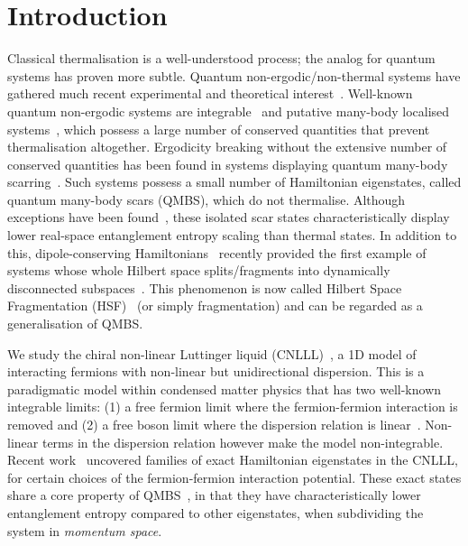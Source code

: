 \documentclass[aps,prx,10pt,twocolumn,amsmath,amssymb,superscriptaddress]{revtex4-2}
\theoremstyle{definition}
\theoremstyle{definition}
\begin{document}
\section{Introduction} \label{sec: intro}
Classical thermalisation is a well-understood process; the analog for quantum systems has proven more subtle. Quantum non-ergodic/non-thermal systems have gathered much recent experimental and theoretical interest~\cite{Moudgalya_2022, Serbyn_2021, Bernien_2017, Zhang_2022, Larson_2013, Nandkishore_2015, experimental1, experimental2, experimental3}. Well-known quantum non-ergodic systems are integrable~\cite{Kitaev_2003,faddeev1996algebraic, Slavnov_2007} and putative many-body localised systems~\cite{Abanin_2019, alet2018many, pal2010many, abanin2017recent, Imbrie_2017}, which possess a large number of conserved quantities that prevent thermalisation altogether. Ergodicity breaking without the extensive number of conserved quantities has been found in systems displaying quantum many-body scarring~\cite{turner2018weak, papic2021weak, Yao_2022, MondragonShem_2021, Gotta_2023, PhysRevLett.122.173401, PhysRevB.101.195131, PhysRevB.101.205107, PhysRevResearch.2.022065, PhysRevResearch.2.043305, PhysRevB.98.155134, PhysRevB.104.L121103, PhysRevB.98.235156, PhysRevB.101.174308, PhysRevLett.125.230602, PhysRevResearch.1.033144, PhysRevB.102.085140, liska2023holographic}. Such systems possess a small number of Hamiltonian eigenstates, called quantum many-body scars (QMBS), which do not thermalise. Although exceptions have been found~\cite{Langlett_2022, PhysRevLett.127.150601}, these isolated scar states characteristically display lower real-space entanglement entropy scaling than thermal states. In addition to this, dipole-conserving Hamiltonians~\cite{First_HSF_2020} recently provided the first example of systems whose whole Hilbert space splits/fragments into dynamically disconnected subspaces~\cite{PhysRevX.12.011050, SciPostPhys.13.4.098, HSF_opensystems, PhysRevB.103.235133, Brighi_2023, PhysRevE.104.044106}. This phenomenon is now called Hilbert Space Fragmentation (HSF)~\cite{Moudgalya_2022} (or simply fragmentation) and can be regarded as a generalisation of QMBS.

We study the chiral non-linear Luttinger liquid (CNLLL)~\cite{Haldane_1981, 1.1342524, doi:10.1126/science.1165403, RevModPhys.75.1449, SIRKER_2012}, a 1D model of interacting fermions with non-linear but unidirectional dispersion. This is a paradigmatic model within condensed matter physics that has two well-known integrable limits: (1) a free fermion limit where the fermion-fermion interaction is removed and (2) a free boson limit where the dispersion relation is linear~\cite{Haldane_1981}. Non-linear terms in the dispersion relation however make the model non-integrable. Recent work~\cite{Schindler_2022} uncovered families of exact Hamiltonian eigenstates in the CNLLL, for certain choices of the fermion-fermion interaction potential. These exact states share a core property of QMBS~\cite{IvarMartinLLScars22}, in that they have characteristically lower entanglement entropy compared to other eigenstates, when subdividing the system in \emph{momentum space}.
\end{document}
